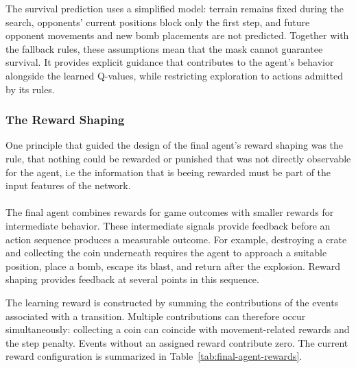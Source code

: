 \documentclass[11pt,a4paper]{article}
\begin{document}
The survival prediction uses a simplified model: terrain remains
fixed during the search, opponents' current positions block only
the first step, and future opponent movements and new bomb
placements are not predicted. Together with the fallback rules,
these assumptions mean that the mask cannot guarantee survival.
It provides explicit guidance that contributes to the agent's
behavior alongside the learned Q-values, while restricting
exploration to actions admitted by its rules.

\subsubsection{The Reward Shaping}
One principle that guided the design of the final agent's reward shaping was the rule, that nothing could be rewarded or punished that was not directly observable for the agent, i.e the information that is beeing rewarded must be part of the input features of the network.\\\\
The final agent combines rewards for game outcomes with smaller
rewards for intermediate behavior. These intermediate signals provide
feedback before an action sequence produces a measurable outcome.
For example, destroying a crate and collecting the coin underneath
requires the agent to approach a suitable position, place a bomb,
escape its blast, and return after the explosion. Reward shaping
provides feedback at several points in this sequence.

The learning reward is constructed by summing the contributions of
the events associated with a transition. Multiple contributions can
therefore occur simultaneously: collecting a coin can coincide with
movement-related rewards and the step penalty. Events without an
assigned reward contribute zero. The current reward configuration is
summarized in Table~\ref{tab:final-agent-rewards}.
\end{document}
